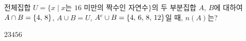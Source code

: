 전체집합 $U=\{x \mid x$는 $16$ 미만의 짝수인 자연수$\}$의 두 부분집합 $A$, $B$에 대하여 $A\cap B=\{4,\mkern3mu 8\}$, $A\cup B=U$, ${A}^{\mathrm{c}}\cup B=\{4,\mkern3mu 6,\mkern3mu 8,\mkern3mu 12\}$일 때, $n(A)$는?
\begin{choices32}{$2$}{$3$}{$4$}{$5$}{$6$}\end{choices32}
